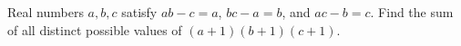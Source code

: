 Real numbers $a,b,c$ satisfy $ab-c=a$, $bc-a=b$, and $ac-b=c$. Find the sum of all distinct possible values of $(a+1)(b+1)(c+1)$.
